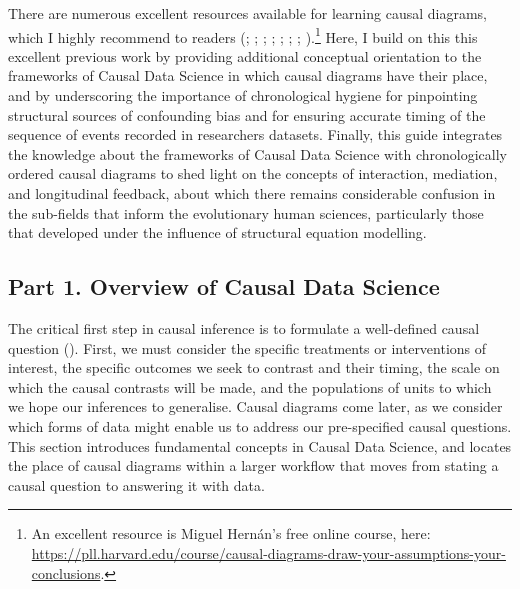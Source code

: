 \documentclass[
  singlecolumn,
  9pt]{article}
\begin{document}
There are numerous excellent resources available for learning causal
diagrams, which I highly recommend to readers
(;
;
;
;
;
; ; ).\footnote{An excellent resource is Miguel Hernán's free online
  course, here:
  \url{https://pll.harvard.edu/course/causal-diagrams-draw-your-assumptions-your-conclusions}.}
Here, I build on this this excellent previous work by providing
additional conceptual orientation to the frameworks of Causal Data
Science in which causal diagrams have their place, and by underscoring
the importance of chronological hygiene for pinpointing structural
sources of confounding bias and for ensuring accurate timing of the
sequence of events recorded in researchers datasets. Finally, this guide
integrates the knowledge about the frameworks of Causal Data Science
with chronologically ordered causal diagrams to shed light on the
concepts of interaction, mediation, and longitudinal feedback, about
which there remains considerable confusion in the sub-fields that inform
the evolutionary human sciences, particularly those that developed under
the influence of structural equation modelling.

\subsection{Part 1. Overview of Causal Data
Science}\label{part-1.-overview-of-causal-data-science}

The critical first step in causal inference is to formulate a
well-defined causal question (). First, we must consider the specific treatments or
interventions of interest, the specific outcomes we seek to contrast and
their timing, the scale on which the causal contrasts will be made, and
the populations of units to which we hope our inferences to generalise.
Causal diagrams come later, as we consider which forms of data might
enable us to address our pre-specified causal questions. This section
introduces fundamental concepts in Causal Data Science, and locates the
place of causal diagrams within a larger workflow that moves from
stating a causal question to answering it with data.
\end{document}
